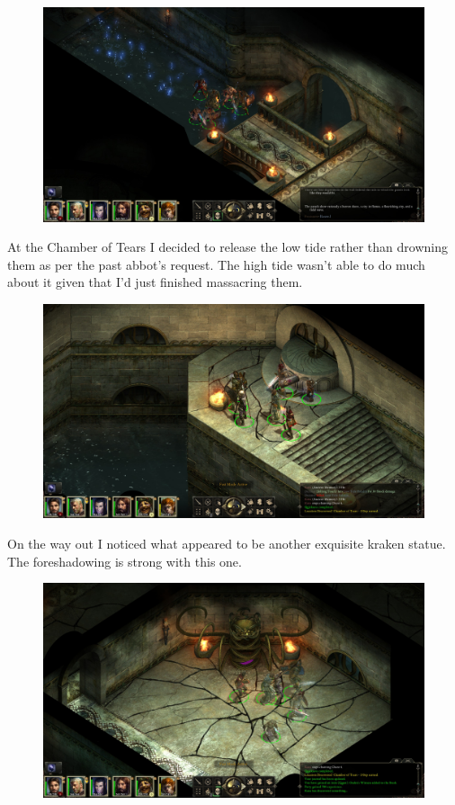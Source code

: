 \documentclass{article}
\begin{document}
\begin{figure}
\includegraphics[scale=0.33]{files/blog/2020_01_18_poe_potd_wmpt2/2020_01_18_abbey09.jpg}
\end{figure}

At the Chamber of Tears I decided to release the low tide rather than drowning them as per the past abbot's request.  The high tide wasn't able to do much about it given that I'd just finished massacring them.

\begin{figure}
\includegraphics[scale=0.33]{files/blog/2020_01_18_poe_potd_wmpt2/2020_01_18_abbey10.jpg}
\end{figure}

On the way out I noticed what appeared to be another exquisite kraken statue.  The foreshadowing is strong with this one.

\begin{figure}
\includegraphics[scale=0.33]{files/blog/2020_01_18_poe_potd_wmpt2/2020_01_18_abbey11.jpg}
\end{figure}
\end{document}
